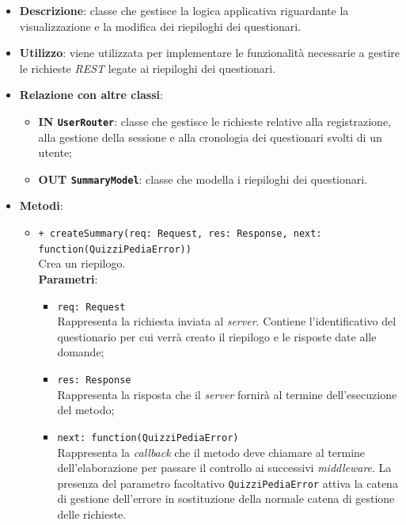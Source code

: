 \begin{itemize}
	\item \textbf{Descrizione}:
	classe che gestisce la logica applicativa riguardante la visualizzazione e la modifica dei riepiloghi dei questionari.
	\item \textbf{Utilizzo}:
	viene utilizzata per implementare le funzionalità necessarie a gestire le richieste \textit{REST} legate ai riepiloghi dei questionari.
	\item \textbf{Relazione con altre classi}:
	\begin{itemize}
			\item \textbf{IN \texttt{UserRouter}}:
			classe che gestisce le richieste relative alla registrazione, alla gestione della sessione e alla cronologia dei questionari svolti di un utente;
			\item \textbf{OUT \texttt{SummaryModel}}:
			classe che modella i riepiloghi dei questionari.
	\end{itemize}
	\item \textbf{Metodi}:
	\begin{itemize}
		\item \texttt{+ createSummary(req: Request, res: Response, next: \\function(QuizziPediaError))}\\
		Crea un riepilogo.\\
		\textbf{Parametri}:
		\begin{itemize}
			\item \texttt{req: Request}\\
			Rappresenta la richiesta inviata al \textit{server}. Contiene l'identificativo del questionario per cui verrà creato il riepilogo e le risposte date alle domande;
			\item \texttt{res: Response}\\
			Rappresenta la risposta che il \textit{server} fornirà al termine dell'esecuzione del metodo;
			\item \texttt{next: function(QuizziPediaError)}\\
			Rappresenta la \textit{callback} che il metodo deve chiamare al termine dell'elaborazione per passare il controllo ai successivi \textit{middleware}. La presenza del parametro facoltativo \texttt{QuizziPediaError} attiva la catena di gestione dell'errore in sostituzione della normale catena di gestione delle richieste.
		\end{itemize}
	\end{itemize}
\end{itemize}